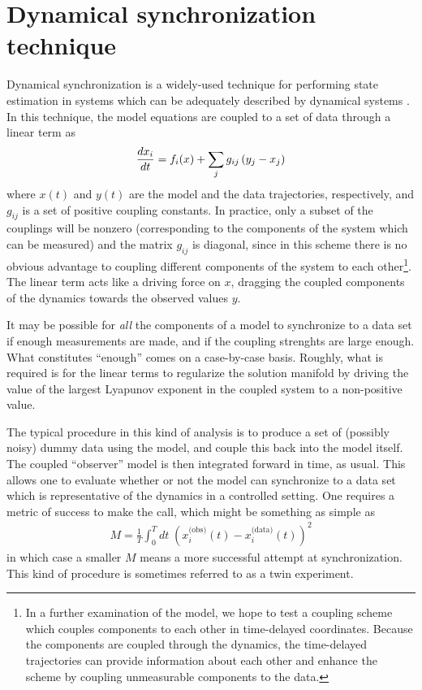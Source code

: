 \documentclass{article} %
\begin{document}
\section{Dynamical synchronization technique}
Dynamical synchronization is a widely-used technique for performing state estimation in systems which can be adequately described by dynamical systems \cite{Abarbanel2009}.  In this technique, the model equations are coupled to a set of data through a linear term as
\begin{align}
	\frac{d x_i}{d t} = f_i(x) + \sum_{j} g_{ij} \left(y_j - x_j\right)
\end{align}
where $x(t)$ and $y(t)$ are the model and the data trajectories, respectively, and $g_{ij}$ is a set of positive coupling constants.  In practice, only a subset of the couplings will be nonzero (corresponding to the components of the system which can be measured) and the matrix $g_{ij}$ is diagonal, since in this scheme there is no obvious advantage to coupling different components of the system to each other\footnote{In a further examination of the model, we hope to test a coupling scheme which couples components to each other in time-delayed coordinates.  Because the components are coupled through the dynamics, the time-delayed trajectories can provide information about each other and enhance the scheme by coupling unmeasurable components to the data.}.  The linear term acts like a driving force on $x$, dragging the coupled components of the dynamics towards the observed values $y$.

It may be possible for \emph{all} the components of a model to synchronize to a data set if enough measurements are made, and if the coupling strenghts are large enough.  What constitutes ``enough'' comes on a case-by-case basis.  Roughly, what is required is for the linear terms to regularize the solution manifold by driving the value of the largest Lyapunov exponent in the coupled system to a non-positive value.

The typical procedure in this kind of analysis is to produce a set of (possibly noisy) dummy data using the model, and couple this back into the model itself.  The coupled ``observer'' model is then integrated forward in time, as usual. This allows one to evaluate whether or not the model can synchronize to a data set which is representative of the dynamics in a controlled setting.  One requires a metric of success to make the call, which might be something as simple as
\begin{align}
	M = \frac{1}{T} \int_0^T dt \; \left(x_i^\text{(obs)}(t) - x_i^\text{(data)}(t)\right)^2
\end{align}
in which case a smaller $M$ means a more successful attempt at synchronization.  This kind of procedure is sometimes referred to as a twin experiment.
\end{document}
